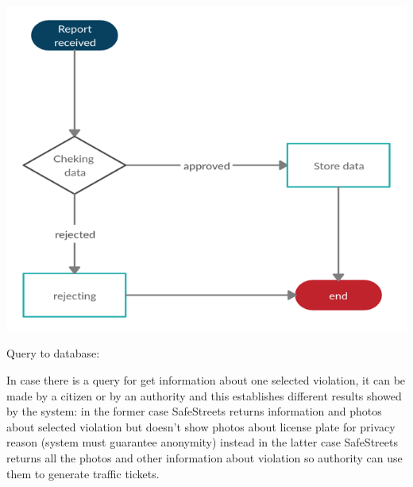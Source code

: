 \documentclass[a4paper, hidelinks, 12pt]{report}
\begin{document}
    \begin{center}
        \includegraphics[]{assets/report.png}\\[1.6 cm]
    \end{center}

	    Query to database:

    	In case there is a query for get information about one selected violation, it can be made by a citizen or by an authority and this establishes different results showed by the system: in the former case SafeStreets returns information and photos about selected violation but doesn’t show photos about license plate for privacy reason (system must guarantee anonymity) instead in the latter case SafeStreets returns all the photos and other information about violation so authority can use them to generate traffic tickets.
\end{document}
